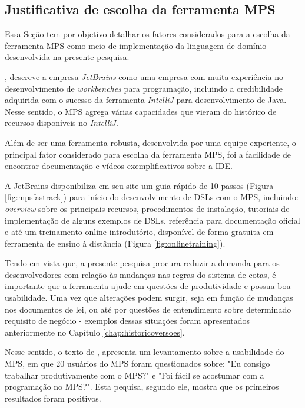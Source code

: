 \clearpage
\subsection{Justificativa de escolha da ferramenta MPS}
\label{justificativamps}

Essa Seção tem por objetivo detalhar os fatores considerados para a escolha da ferramenta \gls{MPS} como meio de implementação da linguagem de domínio desenvolvida na presente pesquisa.

, descreve a empresa \textit{JetBrains} como uma empresa com muita experiência no desenvolvimento de \textit{workbenches} para programação, incluindo a credibilidade adquirida com o sucesso da ferramenta \textit{IntelliJ} para desenvolvimento de Java.  Nesse sentido, o \gls{MPS} agrega várias capacidades que vieram do histórico de recursos disponíveis no \textit{IntelliJ}. 

Além de ser uma ferramenta robusta, desenvolvida por uma equipe experiente, o principal fator considerado para escolha da ferramenta \gls{MPS}, foi a facilidade de encontrar documentação e vídeos exemplificativos sobre a \gls{IDE}. 

A JetBrains disponibiliza em seu site um guia rápido de 10 passos (Figura \ref{fig:mpsfastrack}) para início do desenvolvimento de \gls{DSL}s com o \gls{MPS}, incluindo: \textit{overview} sobre os principais recursos, procedimentos de instalação, tutoriais de implementação de alguns exemplos de \gls{DSL}s, referência para documentação oficial e até um treinamento online introdutório, disponível de forma gratuita em ferramenta de ensino à distância (Figura \ref{fig:onlinetraining}).  





\newpage
Tendo em vista que, a presente pesquisa procura reduzir a demanda para os desenvolvedores com relação às mudanças nas regras do sistema de cotas, é importante que a ferramenta ajude em questões de produtividade e possua boa usabilidade. Uma vez que alterações podem surgir, seja em função de mudanças nos documentos de lei, ou até por questões de entendimento sobre determinado requisito de negócio - exemplos dessas situações foram apresentados anteriormente no Capítulo \ref{chap:historicoversoes}.

Nesse sentido, o texto de  , apresenta um levantamento sobre a usabilidade do \gls{MPS}, em que 20 usuários do \gls{MPS} foram questionados sobre: "Eu consigo trabalhar produtivamente com o MPS?" e "Foi fácil se acostumar com a programação no MPS?". Esta pequisa, segundo ele, mostra que os primeiros resultados foram positivos. 

